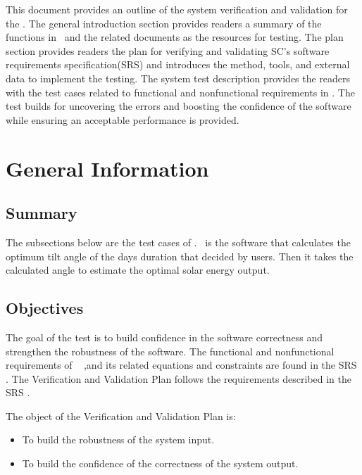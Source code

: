 \documentclass[12pt, titlepage]{article}
\begin{document}

\newpage


This document provides an outline of the system verification and validation for
the \progname. The general introduction section provides readers a summary of
the functions in \progname ~and the related documents as the resources for
testing. The plan section provides readers the plan for verifying and
validating SC's software requirements specification(SRS) and introduces the
method, tools, and external data to implement the testing. The system test
description
provides the readers with the test cases related to functional and nonfunctional
requirements in \progname. The test builds for uncovering the errors and
boosting the confidence of the software while ensuring an acceptable
performance is provided. 



\section{General Information}
\subsection{Summary}

The subsections below are the test cases of \progname. \progname ~is the
software that calculates the optimum tilt angle of the days duration that
decided by users. Then it takes the calculated angle to estimate the optimal
solar energy output.


\subsection{Objectives}\label{Objectives}
The goal of the test is to build confidence in the software correctness and
strengthen the robustness of the software. The functional and nonfunctional
requirements of \progname~ ,and its related equations and constraints are
found in the SRS \cite{YS2019}. The Verification and Validation Plan follows
the requirements described in the SRS \cite{YS2019}.

The object of the Verification and Validation Plan is:
\noindent \begin{itemize}

\item[ ] To build the robustness of the system input.
\item[ ] To build the confidence of the correctness of the system output.

\noindent \end{itemize}
\end{document}
